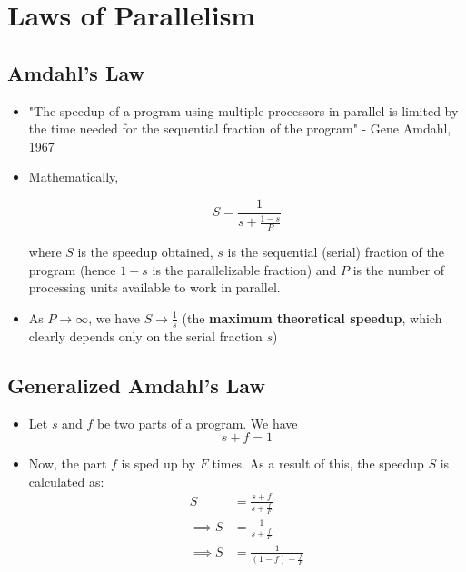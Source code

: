 \documentclass{article}
\begin{document}
\section{Laws of Parallelism}
\subsection{Amdahl's Law}
\begin{itemize}
    \item "The speedup of a program using multiple processors in parallel is limited by the time needed for the sequential fraction of the program" - Gene Amdahl, 1967
    
    \item Mathematically, 
    
    \begin{equation}
        S = \frac{1}{s + \frac{1-s}{P}}
    \end{equation}
    
    where $S$ is the speedup obtained, $s$ is the sequential (serial) fraction of the program (hence $1-s$ is the parallelizable fraction) and $P$ is the number of processing units available to work in parallel.
    
    \item As $P \rightarrow \infty$, we have $S \rightarrow \frac{1}{s}$ (the \textbf{maximum theoretical speedup}, which clearly depends only on the serial fraction $s$)
\end{itemize}
\subsection{Generalized Amdahl's Law}
\begin{itemize}
    \item Let $s$ and $f$ be two parts of a program. We have
    \begin{equation*}
        s + f = 1
    \end{equation*}
    
    \item Now, the part $f$ is sped up by $F$ times. As a result of this, the speedup $S$ is calculated as:
    \begin{align}
        S &= \frac{s+f}{s + \frac{f}{F}} \\
        \implies S &= \frac{1}{s + \frac{f}{F}} \\
        \implies S &= \frac{1}{ (1-f) + \frac{f}{F}}
    \end{align}
\end{itemize}
\end{document}
